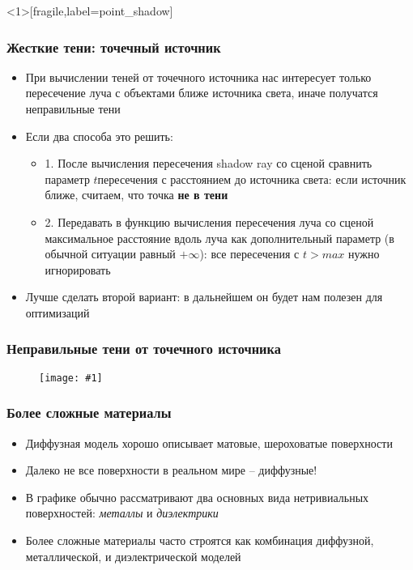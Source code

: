 \documentclass[10pt]{beamer}
\newcommand{\slideimage}[1]{
  \begin{figure}
    \begin{adjustbox}{width=\textwidth, totalheight=\textheight-2\baselineskip-2\baselineskip,keepaspectratio}
      \texttt{[image: \#1]}
    \end{adjustbox}
  \end{figure}
}
\begin{document}
\begin{frame}<1>[fragile,label=point_shadow]
\frametitle{Жесткие тени: точечный источник}
\begin{itemize}
\item При вычислении теней от точечного источника нас интересует только пересечение луча с объектами ближе источника света, иначе получатся неправильные тени
\pause
\item Если два способа это решить:
\pause
\begin{itemize}
\item 1. После вычисления пересечения shadow ray со сценой сравнить параметр \begin{math}t\end{math}пересечения с расстоянием до источника света: если источник ближе, считаем, что точка \textbf{не в тени}
\pause
\item 2. Передавать в функцию вычисления пересечения луча со сценой максимальное расстояние вдоль луча как дополнительный параметр (в обычной ситуации равный \begin{math}+\infty\end{math}): все пересечения с \begin{math}t > max\end{math} нужно игнорировать
\end{itemize}
\pause
\item Лучше сделать второй вариант: в дальнейшем он будет нам полезен для оптимизаций
\end{itemize}
\end{frame}

\begin{frame}[fragile]
\frametitle{Неправильные тени от точечного источника}
\slideimage{wrong_shadow.png}
\end{frame}






\begin{frame}[fragile]
\frametitle{Более сложные материалы}
\begin{itemize}
\item Диффузная модель хорошо описывает матовые, шероховатые поверхности
\pause
\item Далеко не все поверхности в реальном мире -- диффузные!
\pause
\item В графике обычно рассматривают два основных вида нетривиальных поверхностей: \textit{металлы} и \textit{диэлектрики}
\pause
\item Более сложные материалы часто строятся как комбинация диффузной, металлической, и диэлектрической моделей
\end{itemize}
\end{frame}
\end{document}
